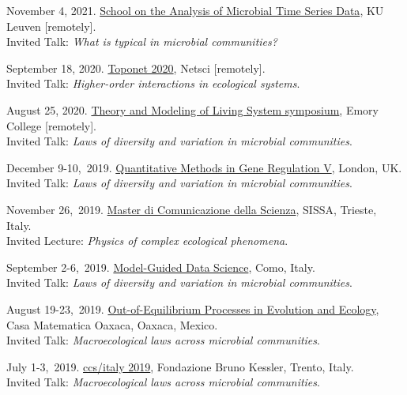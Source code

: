 \documentclass[10pt]{article}
\begin{document}
\begin{outerlist}
    \item November 4, 2021.
	 \href{http://msysbiology.com/microbialtimeseries/index.php}{School on the Analysis of Microbial Time Series Data}, KU Leuven [remotely].\\
	Invited Talk: 
	\emph{What is typical in microbial communities?}%

    \item September 18, 2020.
	 \href{https://sites.google.com/view/toponets2020/}{Toponet 2020}, Netsci [remotely].\\
	Invited Talk: 
	\emph{Higher-order interactions in ecological systems}. %

    \item August 25, 2020.
	 \href{http://livingtheory.emory.edu/programs/conferences-symposiums.html}{Theory and Modeling of Living System symposium}, Emory College [remotely].\\
	Invited Talk: 
	\emph{Laws of diversity and variation in microbial communities}. %

    \item December 9-10,~2019.
	 \href{http://gene2019.iopconfs.org}{Quantitative Methods in Gene Regulation V}, London, UK.\\
	Invited Talk: 
	\emph{Laws of diversity and variation in microbial communities}. %

    \item November 26,~2019.
	 \href{https://mcs.sissa.it/}{Master di Comunicazione della Scienza}, SISSA, Trieste, Italy.\\
	Invited Lecture: 
	\emph{Physics of complex ecological phenomena}. %

    \item September 2-6,~2019.
	 \href{https://mgds.lakecomoschool.org}{Model-Guided Data Science}, Como, Italy.\\
	Invited Talk: 
	\emph{Laws of diversity and variation in microbial communities}. %

    \item August 19-23,~2019.
	 \href{https://www.birs.ca/events/2019/5-day-workshops/19w5150}{Out-of-Equilibrium Processes in Evolution and Ecology}, Casa Matematica Oaxaca, Oaxaca, Mexico.\\
	Invited Talk: 
	\emph{Macroecological laws across microbial communities}. %

    \item July 1-3,~2019.
	 \href{http://italy.cssociety.org/index.php/ccs-italy-2019/}{ccs/italy 2019}, Fondazione Bruno Kessler, Trento, Italy.\\
	Invited Talk: 
	\emph{Macroecological laws across microbial communities}. %



\end{outerlist}
\end{document}
